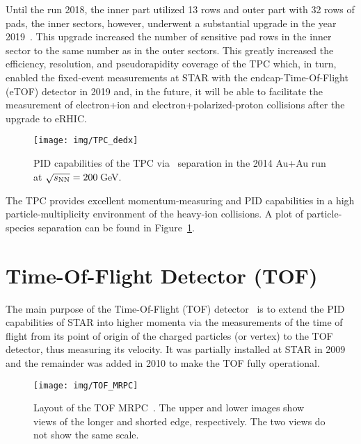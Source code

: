 Until the run 2018, the inner part utilized 13 rows and outer part with 32 rows of pads, the inner sectors, however, underwent a substantial 
upgrade in the year 2019~\cite{iTPC}. This upgrade increased the number of sensitive pad rows in the inner sector to the same number as in the outer sectors. This greatly
increased the efficiency, resolution, and pseudorapidity coverage of the TPC which, in turn, enabled the fixed-event measurements at STAR with the endcap-Time-Of-Flight (eTOF) detector in 2019 and, in the future, it will be able to facilitate the measurement of electron+ion and electron+polarized-proton collisions after the upgrade to eRHIC\@. 

\begin{figure}[!htb]
\begin{center}
 \texttt{[image: img/TPC\_dedx]}\\
\end{center}
\caption{\label{TpcPid}PID capabilities of the TPC via \dedx\ separation in the 2014 Au+Au run at $\sqrt{s_\text{NN}} = 200\,$GeV\@.}
\end{figure}

The TPC provides excellent momentum-measuring and PID capabilities in a high particle-multiplicity environment of the heavy-ion collisions.
A plot of particle-species separation can be found in Figure~\ref{TpcPid}.
\section{Time-Of-Flight Detector (TOF)\label{TOFsection}} 



The main purpose of the Time-Of-Flight (TOF) detector~\cite{TOFproposal} is to extend the PID capabilities of STAR into higher 
momenta via the measurements of the time of flight from its point of origin of the charged particles (or vertex) to the TOF 
detector, thus measuring its velocity. It was partially installed at STAR in 2009 and the remainder was added in 2010 
to make the TOF fully operational.

\begin{figure}[!htb]
\begin{center}
 \texttt{[image: img/TOF\_MRPC]}\\
\end{center}
\caption{\label{TOF_mrpc}Layout of the TOF MRPC~\cite{TOFproposal}\@. The upper and lower images show views of the longer and shorted edge, respectively. The two views do not show the same scale.}
\end{figure}


